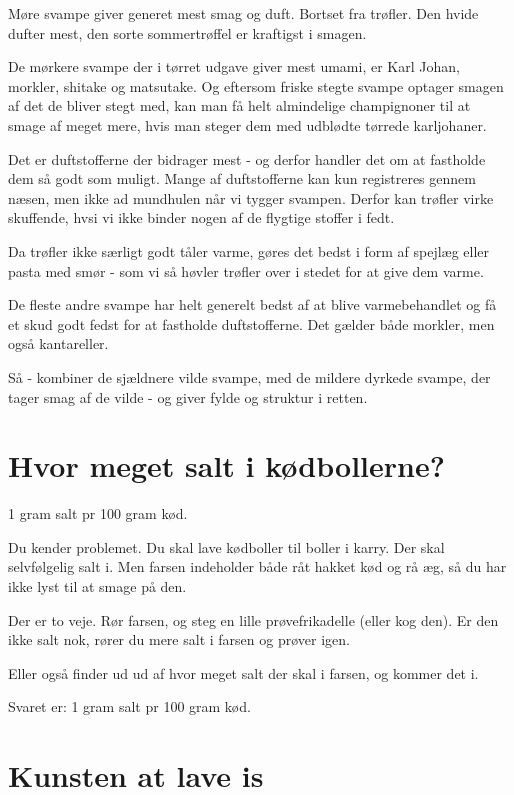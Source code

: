 \documentclass[
]{book}
\begin{document}
Møre svampe giver generet mest smag og duft. Bortset fra trøfler. Den hvide dufter
mest, den sorte sommertrøffel er kraftigst i smagen.

De mørkere svampe der i tørret udgave giver mest umami, er Karl Johan, morkler,
shitake og matsutake. Og eftersom friske stegte svampe optager smagen af det
de bliver stegt med, kan man få helt almindelige champignoner til at smage af
meget mere, hvis man steger dem med udblødte tørrede karljohaner.

Det er duftstofferne der bidrager mest - og derfor handler det om at fastholde
dem så godt som muligt. Mange af duftstofferne kan kun registreres gennem næsen,
men ikke ad mundhulen når vi tygger svampen. Derfor kan trøfler virke skuffende,
hvsi vi ikke binder nogen af de flygtige stoffer i fedt.

Da trøfler ikke særligt godt tåler varme, gøres det bedst i form af spejlæg eller
pasta med smør - som vi så høvler trøfler over i stedet for at give dem varme.

De fleste andre svampe har helt generelt bedst af at blive varmebehandlet og
få et skud godt fedst for at fastholde duftstofferne. Det gælder både morkler,
men også kantareller.

Så - kombiner de sjældnere vilde svampe, med de mildere dyrkede svampe,
der tager smag af de vilde - og giver fylde og struktur i retten.

\hypertarget{hvor-meget-salt-i-kuxf8dbollerne}{%
\section{Hvor meget salt i kødbollerne?}\label{hvor-meget-salt-i-kuxf8dbollerne}}

1 gram salt pr 100 gram kød.

Du kender problemet. Du skal lave kødboller til boller i karry. Der skal selvfølgelig salt i. Men farsen indeholder både råt hakket kød og rå æg, så du har ikke lyst til at smage på den.

Der er to veje. Rør farsen, og steg en lille prøvefrikadelle (eller kog den). Er den ikke salt nok, rører du mere salt i farsen og prøver igen.

Eller også finder ud ud af hvor meget salt der skal i farsen, og kommer det i.

Svaret er: 1 gram salt pr 100 gram kød.

\hypertarget{kunsten-at-lave-is}{%
\section{Kunsten at lave is}\label{kunsten-at-lave-is}}
\end{document}
